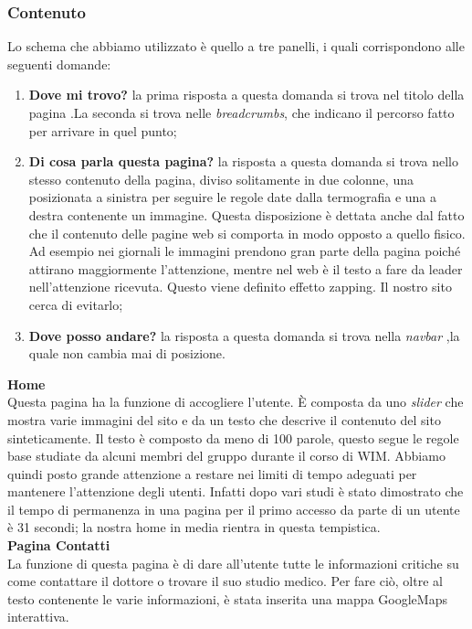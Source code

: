 \subsubsection{Contenuto}
Lo schema che abbiamo utilizzato è quello a tre panelli, i quali corrispondono alle seguenti domande:
\begin{enumerate}
\item \textbf{Dove mi trovo?} la prima risposta a questa domanda si trova nel titolo della pagina .La seconda si trova nelle \textit{breadcrumbs}, che indicano il percorso fatto per arrivare in quel punto;
\item \textbf{Di cosa parla questa pagina?} la risposta a questa domanda si trova nello stesso contenuto della pagina, diviso solitamente in due colonne, una posizionata a sinistra per seguire le regole date dalla termografia e una a destra contenente un immagine. Questa disposizione è dettata anche dal fatto che il contenuto delle pagine web si comporta in modo opposto a quello fisico. Ad esempio nei giornali le immagini prendono gran parte della pagina poiché attirano maggiormente l'attenzione, mentre nel web è il testo a fare da leader nell’attenzione ricevuta. Questo viene definito effetto zapping. Il nostro sito cerca di evitarlo;
\item \textbf{Dove posso andare?} la risposta a questa domanda si trova nella \textit{navbar} ,la quale non cambia mai di posizione. \\
\end{enumerate}


\textbf{Home} \\ 
Questa pagina ha la funzione di accogliere l’utente. È composta da uno \textit{slider} che mostra varie immagini del sito e da un testo che descrive il contenuto del sito sinteticamente.
Il testo è composto da meno di 100 parole, questo segue le regole base studiate da alcuni membri del gruppo durante il corso di WIM. Abbiamo quindi posto grande attenzione a restare nei limiti di tempo adeguati per mantenere l’attenzione degli utenti.
Infatti dopo vari studi è stato dimostrato che il tempo di permanenza in una pagina per il primo accesso da parte di un utente è 31 secondi; la nostra home in media rientra in questa tempistica. \\

\textbf{Pagina Contatti} \\ 
La funzione di questa pagina è di dare all’utente tutte le informazioni critiche su come contattare il dottore o trovare il suo studio medico.
Per fare ciò, oltre al testo contenente le varie informazioni, è stata inserita una mappa GoogleMaps interattiva. \\

